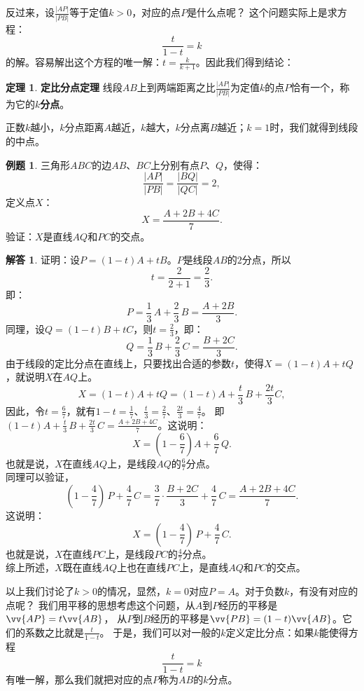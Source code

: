 \documentclass[12pt,UTF8]{ctexbook}
\theoremstyle{definition}
\newtheorem{tm}{定理}[section]
\newtheorem{et}{例题}[section]
\newtheorem*{so}{解答}
\theoremstyle{plain}
\begin{document}
反过来，设$ \frac{|AP|}{|PB|}$等于定值$k > 0$，对应的点$P$是什么点呢？
这个问题实际上是求方程：
$$ \frac{t}{1 - t} = k$$
的解。容易解出这个方程的唯一解：$t = \frac{k}{k+1}$。因此我们得到结论：
\begin{tm}{\textbf{定比分点定理} }\label{tm:0-0-10}
    线段$AB$上到两端距离之比$\frac{|AP|}{|PB|}$为定值$k$的点$P$恰有一个，称为它的$k$\textbf{分点}。
\end{tm}
正数$k$越小，$k$分点距离$A$越近，$k$越大，$k$分点离$B$越近；$k=1$时，我们就得到线段的中点。

\begin{et}\label{et:0-0-10}
    三角形$ABC$的边$AB$、$BC$上分别有点$P$、$Q$，使得：
    $$ \frac{|AP|}{|PB|} = \frac{|BQ|}{|QC|} = 2,$$
    定义点$X$：
    $$ X = \frac{A + 2B + 4C}{7}.$$
    验证：$X$是直线$AQ$和$PC$的交点。
\end{et}
\begin{so}
    证明：设$P = (1 - t)A + tB$。$P$是线段$AB$的$2$分点，所以
    $$ t = \frac{2}{2+1} = \frac23. $$
    即：
    $$ P = \frac13\, A + \frac23 \, B = \frac{A + 2B}{3}.$$
    同理，设$Q = (1 - t)B + tC$，则$t = \frac23$，即：
    $$ Q = \frac{1}{3} \, B + \frac{2}{3}\, C = \frac{B + 2C}{3}. $$
    由于线段的定比分点在直线上，只要找出合适的参数$t$，使得$X = (1 - t)A + tQ$，就说明$X$在$AQ$上。
    $$ X = (1 - t)A + tQ = (1 - t)A + \frac{t}{3}\,B + \frac{2t}{3}C,$$
    因此，令$t = \frac{6}{7}$，就有$1 - t = \frac{1}{7}$、$\frac{t}{3} = \frac27$、$\frac{2t}{3} = \frac{4}{7}$。
    即$(1 - t)A + \frac{t}{3} \, B + \frac{2t}{3} \, C = \frac{A + 2B + 4C}{7}$。这说明：
    $$ X = (1 - \frac{6}{7})A + \frac{6}{7} \, Q. $$
    也就是说，$X$在直线$AQ$上，是线段$AQ$的$\frac{6}{7}$分点。\\
    同理可以验证，
    $$ (1 - \frac{4}{7})\, P + \frac{4}{7}\, C = \frac{3}{7} \cdot \frac{B + 2C}{3} + \frac{4}{7} \, C = \frac{A + 2B + 4C}{7}. $$
    这说明：
    $$ X = (1 - \frac{4}{7}) \, P + \frac{4}{7} \, C. $$
    也就是说，$X$在直线$PC$上，是线段$PC$的$\frac{4}{7}$分点。\\
    综上所述，$X$既在直线$AQ$上也在直线$PC$上，是直线$AQ$和$PC$的交点。
\end{so}

以上我们讨论了$k>0$的情况，显然，$k=0$对应$P = A$。对于负数$k$，有没有对应的点呢？
我们用平移的思想考虑这个问题，从$A$到$P$经历的平移是$\vv{AP} = t\vv{AB}$，
从$P$到$B$经历的平移是$\vv{PB} = (1 - t)\vv{AB}$。它们的系数之比就是$ \frac{t}{1 - t}$。
于是，我们可以对一般的$k$定义定比分点：如果$k$能使得方程
$$ \frac{t}{1 - t} = k$$
有唯一解，那么我们就把对应的点$P$称为$AB$的$k$分点。
\end{document}
